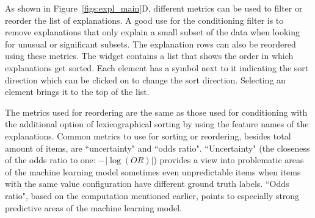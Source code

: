 
As shown in Figure~\ref{figs:expl_main}D, different metrics can be used to filter or reorder the list of explanations.  
A good use for the conditioning filter is to remove explanations that only explain a small subset of the data when looking for unusual or significant subsets.
The explanation rows can also be reordered using these metrics. 
The widget contains a list that shows the order in which explanations get sorted.
Each element has a symbol next to it indicating the sort direction which can be clicked on to change the sort direction.
Selecting an element brings it to the top of the list.

The metrics used for reordering are the same as those used for conditioning with the additional option of lexicographical sorting by using the feature names of the explanations.
Common metrics to use for sorting or reordering, besides total amount of items, are ``uncertainty" and ``odds ratio".
``Uncertainty" (the closeness of the odds ratio to one: $-| \log{(OR)} |$) provides a view into problematic areas of the machine learning model sometimes even unpredictable items when items with the same value configuration have different ground truth labels.
``Odds ratio", based on the computation mentioned earlier, points to especially strong predictive areas of the machine learning model.

